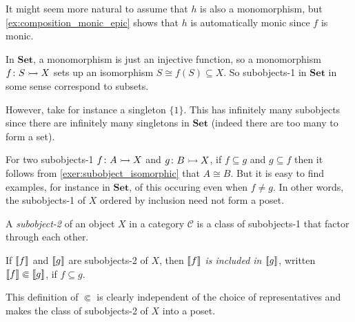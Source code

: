 \documentclass[article, a4paper, 11pt, oneside]{memoir}
\numberwithin{equation}{chapter}
\newcommand{\cat}[1]{\mathcal{#1}}
\newcommand{\ncat}[1]{\mathbf{#1}} %
\newcommand{\catSet}{\ncat{Set}}
\newcommand{\catC}{\cat{C}}
\DeclarePairedDelimiter{\subobj}{\llbracket}{\rrbracket}
\begin{document}
\begin{remark}
    It might seem more natural to assume that $h$ is also a monomorphism, but \cref{ex:composition_monic_epic} shows that $h$ is automatically monic since $f$ is monic.
\end{remark}


\begin{examplebreak}
    \begin{enumexample}
        \item In $\catSet$, a monomorphism is just an injective function, so a monomorphism $f \colon S \rightarrowtail X$ sets up an isomorphism $S \cong f(S) \subseteq X$. So subobjects-1 in $\catSet$ in some sense correspond to subsets.
        
        However, take for instance a singleton $\{1\}$. This has infinitely many subobjects since there are infinitely many singletons in $\catSet$ (indeed there are too many to form a set).
        
        \item For two subobjects-1 $f \colon A \rightarrowtail X$ and $g \colon B \rightarrowtail X$, if $f \subseteq g$ and $g \subseteq f$ then it follows from \cref{exer:subobject_isomorphic} that $A \cong B$. But it is easy to find examples, for instance in $\catSet$, of this occuring even when $f \neq g$. In other words, the subobjects-1 of $X$ ordered by inclusion need not form a poset.
    \end{enumexample}
\end{examplebreak}


\begin{definition}
    A \emph{subobject-2} of an object $X$ in a category $\catC$ is a class of subobjects-1 that factor through each other.

    If $\subobj{f}$ and $\subobj{g}$ are subobjects-2 of $X$, then \emph{$\subobj{f}$ is included in $\subobj{g}$}, written $\subobj{f} \Subset \subobj{g}$, if $f \subseteq g$.
\end{definition}
%
This definition of $\Subset$ is clearly independent of the choice of representatives and makes the class of subobjects-2 of $X$ into a poset.

\end{document}
